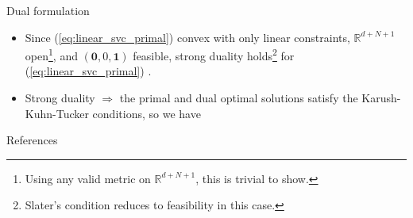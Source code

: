 \documentclass{beamer}
\numberwithin{equation}{section}
\newcommand{\aref}[1]{\alert{\ref{#1}}}
\begin{document}
\begin{frame}{Dual formulation}
    \begin{itemize}
        \item
        Since (\aref{eq:linear_svc_primal}) convex with only linear
        constraints, $ \mathbb{R}^{d + N + 1} $ open\footnote{
            Using any valid metric on $ \mathbb{R}^{d + N + 1} $, this is
            trivial to show.
        }, and
        $ (\mathbf{0}, 0, \mathbf{1}) $ feasible, strong duality
        holds\footnote{
            Slater's condition reduces to feasibility in this case.
        } for (\aref{eq:linear_svc_primal})
        \cite{bv_convex_opt}.

        \item
        Strong duality $ \Rightarrow $ the primal and dual optimal
        solutions satisfy the Karush-Kuhn-Tucker conditions, so we have
    \end{itemize}
\end{frame}

\begin{frame}{References}
    
    
\end{frame}
\end{document}
